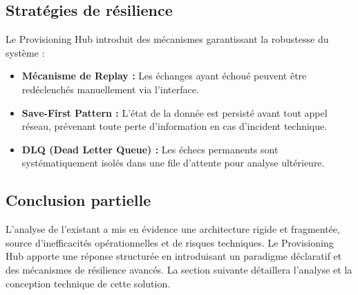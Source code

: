 \subsection{Stratégies de résilience}
Le Provisioning Hub introduit des mécanismes garantissant la robustesse du système :
\begin{itemize}
    \item \textbf{Mécanisme de Replay :} Les échanges ayant échoué peuvent être redéclenchés manuellement via l'interface.
    \item \textbf{Save-First Pattern :} L'état de la donnée est persisté avant tout appel réseau, prévenant toute perte d'information en cas d'incident technique.
    \item \textbf{DLQ (Dead Letter Queue) :} Les échecs permanents sont systématiquement isolés dans une file d'attente pour analyse ultérieure.
\end{itemize}

\subsection*{Conclusion partielle}
L'analyse de l'existant a mis en évidence une architecture rigide et fragmentée, source d'inefficacités opérationnelles et de risques techniques. Le Provisioning Hub apporte une réponse structurée en introduisant un paradigme déclaratif et des mécanismes de résilience avancés. La section suivante détaillera l'analyse et la conception technique de cette solution.
